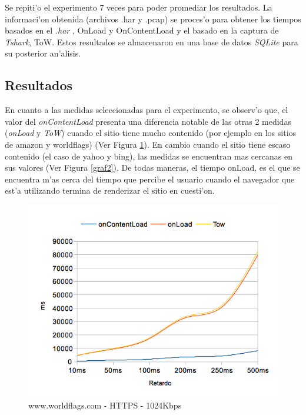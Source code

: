 \documentclass[a4paper,11pt,twocolumn]{article}
\begin{document}
Se repiti'o el experimento 7 veces para poder promediar los resultados. La informaci'on obtenida (archivos .har y .pcap) se proces'o para obtener los tiempos basados en el \emph{.har} \cite{harSpec}, OnLoad y OnContentLoad y el basado en la captura de \emph{Tshark}, ToW. Estos resultados se almacenaron en una base de datos \emph{SQLite} \cite{SQLite} para su posterior an'alisis.

\subsection{Resultados}

En cuanto a las medidas seleccionadas para el experimento, se observ'o que, el valor del \emph{onContentLoad} presenta una diferencia notable de las otras 2 medidas (\emph{onLoad} y \emph{ToW}) cuando el sitio tiene mucho contenido (por ejemplo en los sitios de amazon y worldflags) (Ver Figura \ref{graf1}). En cambio cuando el sitio tiene escaso contenido (el caso de yahoo y bing), las medidas se encuentran mas cercanas en sus valores (Ver Figura \ref{graf2}). De todas maneras, el tiempo onLoad, es el que se encuentra m'as cerca del tiempo que percibe el usuario cuando el navegador que est'a utilizando termina de renderizar el sitio en cuesti'on.

\begin{figure}[h!]
  	\centering
	\includegraphics[scale=0.65]{exp1_1}
	\caption{\small www.worldflags.com - HTTPS - 1024Kbps}
	\label{graf1}
\end{figure}
\end{document}
